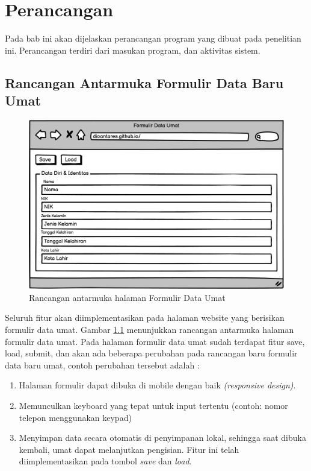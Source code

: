 \chapter{Perancangan}
\label{chap:perancangan}

Pada bab ini akan dijelaskan perancangan program yang dibuat pada penelitian ini. Perancangan terdiri dari masukan program, dan aktivitas sistem.

\section{Rancangan Antarmuka Formulir Data Baru Umat}
\label{sec:rancanganAntarmukaFormulir}

\begin{figure}[H]
	\centering
	\includegraphics[scale=0.6]{Gambar/mockUpWebsite.png}
	\caption{Rancangan antarmuka halaman Formulir Data Umat} 
	\label{fig:formDataUmat}
\end{figure}

Seluruh fitur akan diimplementasikan pada halaman website yang berisikan formulir data umat. Gambar \ref{fig:formDataUmat} menunjukkan rancangan antarmuka halaman formulir data umat. Pada halaman formulir data umat sudah terdapat fitur save, load, submit, dan akan ada  beberapa perubahan pada rancangan baru formulir data baru umat, contoh perubahan tersebut adalah : 

\begin{enumerate}
	\item Halaman formulir dapat dibuka di mobile dengan baik \textit{(responsive design)}.
	\item Memunculkan keyboard yang tepat untuk input tertentu (contoh: nomor telepon menggunakan keypad)
	\item Menyimpan data secara otomatis di penyimpanan lokal, sehingga saat dibuka kembali, umat dapat melanjutkan pengisian. Fitur ini telah diimplementasikan pada tombol \textit{save} dan \textit{load}.
\end{enumerate}

